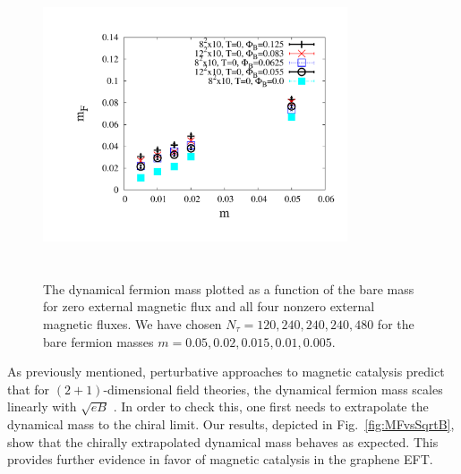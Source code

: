 \documentclass[aps,prd,twocolumn,showpacs,superscriptaddress,groupedaddress]{revtex4}  %
\begin{document}
\begin{figure}
\vspace{-1.2cm}
  \includegraphics[height=9cm,width=9cm]{ferm_mt_vs_m_graphene_paper.pdf} 
  \vspace{-1.25cm}
\caption{The dynamical fermion mass plotted as a function of the bare mass for zero external magnetic flux and all four nonzero external magnetic fluxes. We have chosen $N_{\tau}=120,240,240,240,480$ for the bare fermion masses $m=0.05,0.02,0.015,0.01,0.005$.}
\label{MFvsmNonzeroB}
\end{figure}

As previously mentioned, perturbative approaches to magnetic catalysis predict that for $(2+1)$-dimensional field theories, the dynamical fermion mass scales linearly with $\sqrt{eB}$ \cite{Shovkovy}. In order to check this, one first needs to extrapolate the dynamical mass to the chiral limit. Our results, depicted in Fig.~\ref{fig:MFvsSqrtB}, show that the chirally extrapolated dynamical mass behaves as expected. This provides further evidence in favor of magnetic catalysis in the graphene EFT.
\end{document}
